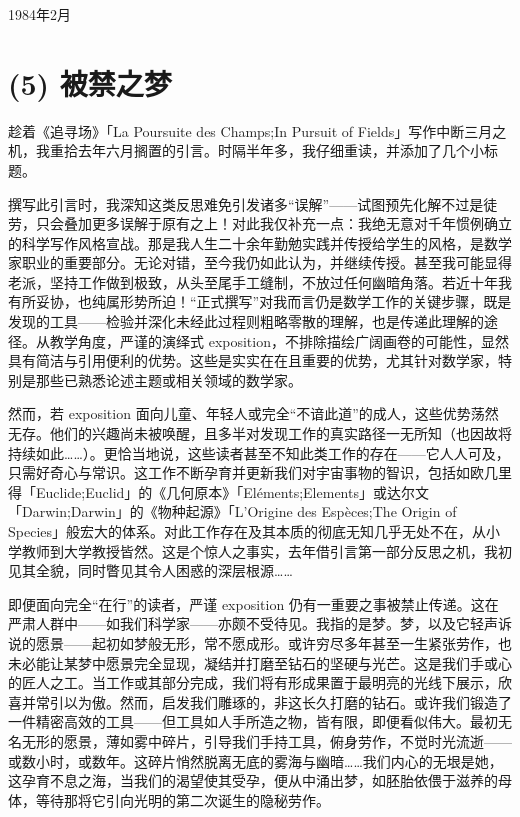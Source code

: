 1984年2月

\section{(5) 被禁之梦}

趁着《追寻场》「La Poursuite des Champs;In Pursuit of Fields」写作中断三月之机，我重拾去年六月搁置的引言。时隔半年多，我仔细重读，并添加了几个小标题。

撰写此引言时，我深知这类反思难免引发诸多“误解”——试图预先化解不过是徒劳，只会叠加更多误解于原有之上！对此我仅补充一点：我绝无意对千年惯例确立的科学写作风格宣战。那是我人生二十余年勤勉实践并传授给学生的风格，是数学家职业的重要部分。无论对错，至今我仍如此认为，并继续传授。甚至我可能显得老派，坚持工作做到极致，从头至尾手工缝制，不放过任何幽暗角落。若近十年我有所妥协，也纯属形势所迫！“正式撰写”对我而言仍是数学工作的关键步骤，既是发现的工具——检验并深化未经此过程则粗略零散的理解，也是传递此理解的途径。从教学角度，严谨的演绎式 exposition，不排除描绘广阔画卷的可能性，显然具有简洁与引用便利的优势。这些是实实在在且重要的优势，尤其针对数学家，特别是那些已熟悉论述主题或相关领域的数学家。

然而，若 exposition 面向儿童、年轻人或完全“不谙此道”的成人，这些优势荡然无存。他们的兴趣尚未被唤醒，且多半对发现工作的真实路径一无所知（也因故将持续如此……）。更恰当地说，这些读者甚至不知此类工作的存在——它人人可及，只需好奇心与常识。这工作不断孕育并更新我们对宇宙事物的智识，包括如欧几里得「Euclide;Euclid」的《几何原本》「Eléments;Elements」或达尔文「Darwin;Darwin」的《物种起源》「L'Origine des Espèces;The Origin of Species」般宏大的体系。对此工作存在及其本质的彻底无知几乎无处不在，从小学教师到大学教授皆然。这是个惊人之事实，去年借引言第一部分反思之机，我初见其全貌，同时瞥见其令人困惑的深层根源……

即便面向完全“在行”的读者，严谨 exposition 仍有一重要之事被禁止传递。这在严肃人群中——如我们科学家——亦颇不受待见。我指的是梦。梦，以及它轻声诉说的愿景——起初如梦般无形，常不愿成形。或许穷尽多年甚至一生紧张劳作，也未必能让某梦中愿景完全显现，凝结并打磨至钻石的坚硬与光芒。这是我们手或心的匠人之工。当工作或其部分完成，我们将有形成果置于最明亮的光线下展示，欣喜并常引以为傲。然而，启发我们雕琢的，非这长久打磨的钻石。或许我们锻造了一件精密高效的工具——但工具如人手所造之物，皆有限，即便看似伟大。最初无名无形的愿景，薄如雾中碎片，引导我们手持工具，俯身劳作，不觉时光流逝——或数小时，或数年。这碎片悄然脱离无底的雾海与幽暗……我们内心的无垠是她，这孕育不息之海，当我们的渴望使其受孕，便从中涌出梦，如胚胎依偎于滋养的母体，等待那将它引向光明的第二次诞生的隐秘劳作。

